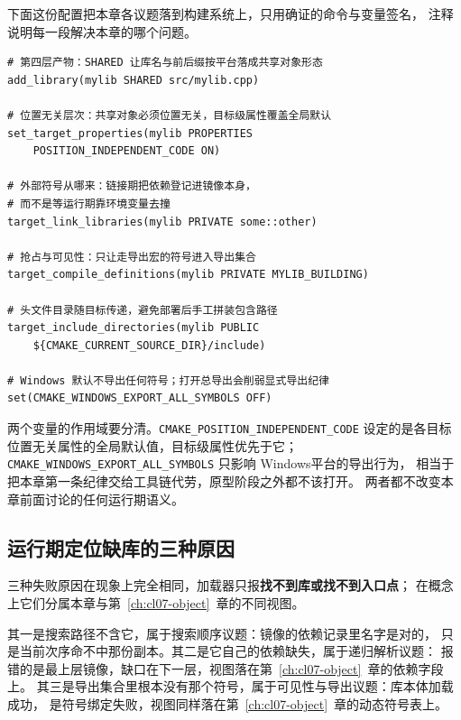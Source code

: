 \documentclass[12pt,a4paper,fontset=fandol]{ctexbook}
\newcommand{\Sw}[1]{\texttt{#1}}
\newcommand{\Win}{\textsf{Windows}}
\begin{document}
下面这份配置把本章各议题落到构建系统上，只用确证的命令与变量签名，
注释说明每一段解决本章的哪个问题。

\begin{lstlisting}[style=cmakestyle,caption={共享库的最小跨平台目标配置（示意）},label={lst:cl09-cmake}]
# 第四层产物：SHARED 让库名与前后缀按平台落成共享对象形态
add_library(mylib SHARED src/mylib.cpp)

# 位置无关层次：共享对象必须位置无关，目标级属性覆盖全局默认
set_target_properties(mylib PROPERTIES
    POSITION_INDEPENDENT_CODE ON)

# 外部符号从哪来：链接期把依赖登记进镜像本身，
# 而不是等运行期靠环境变量去撞
target_link_libraries(mylib PRIVATE some::other)

# 抢占与可见性：只让走导出宏的符号进入导出集合
target_compile_definitions(mylib PRIVATE MYLIB_BUILDING)

# 头文件目录随目标传递，避免部署后手工拼装包含路径
target_include_directories(mylib PUBLIC
    ${CMAKE_CURRENT_SOURCE_DIR}/include)

# Windows 默认不导出任何符号；打开总导出会削弱显式导出纪律
set(CMAKE_WINDOWS_EXPORT_ALL_SYMBOLS OFF)
\end{lstlisting}

两个变量的作用域要分清。\Sw{CMAKE\_POSITION\_INDEPENDENT\_CODE} 设定的是各目标
位置无关属性的全局默认值，目标级属性优先于它；
\Sw{CMAKE\_WINDOWS\_EXPORT\_ALL\_SYMBOLS} 只影响 \Win 平台的导出行为，
相当于把本章第一条纪律交给工具链代劳，原型阶段之外都不该打开。
两者都不改变本章前面讨论的任何运行期语义。

\subsection{运行期定位缺库的三种原因}\label{sec:cl09-missinglib}

三种失败原因在现象上完全相同，加载器只报\textbf{找不到库或找不到入口点}；
在概念上它们分属本章与第~\ref{ch:cl07-object}~章的不同视图。

其一是搜索路径不含它，属于搜索顺序议题：镜像的依赖记录里名字是对的，
只是当前次序命不中那份副本。其二是它自己的依赖缺失，属于递归解析议题：
报错的是最上层镜像，缺口在下一层，视图落在第~\ref{ch:cl07-object}~章的依赖字段上。
其三是导出集合里根本没有那个符号，属于可见性与导出议题：库本体加载成功，
是符号绑定失败，视图同样落在第~\ref{ch:cl07-object}~章的动态符号表上。
\end{document}
